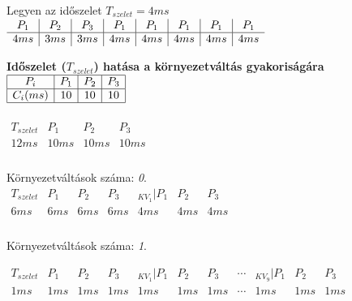 \documentclass[tikz,12pt,margin=0px]{article}
\begin{document}
    \noindent Legyen az időszelet $T_{szelet} = 4 ms$\\

    \noindent $
      \begin{array}{c|c|c|c|c|c|c|c}
        P_{1} & P_{2} & P_{3} & P_{1} & P_{1} & P_{1} & P_{1} & P_{1} \\ \hline
        4ms & 3ms & 3ms & 4ms & 4ms & 4ms & 4ms & 4ms
      \end{array}\\\\
    $

    \noindent \textbf{Időszelet ($T_{szelet}$) hatása a környezetváltás gyakoriságára} \\

    \noindent $\begin{array}{|c|c|c|c|}
                        \hline
                         P_{i} & P_{1} & P_{2} & P_{3}  \\ \hline
                         C_{i}(ms) & 10 & 10 & 10 \\ \hline
                       \end{array}$\\\\

      \noindent $\begin{array}{c||c|c|c}
        T_{szelet} & P_1 & P_2 & P_3  \\ \hline
        12 ms & 10 ms & 10 ms & 10 ms \\
      \end{array}$\\\\

    \noindent Környezetváltások száma: \emph{0}.\\

      \noindent $\begin{array}{c||c|c|c||c|c|c}
        T_{szelet} & P_1 & P_2 & P_3 & _{KV_1} | P_1 & P_2 & P_3  \\ \hline
        6 ms & 6 ms & 6 ms & 6 ms & 4 ms & 4 ms & 4 ms \\
      \end{array}$\\\\

    \noindent Környezetváltások száma: \emph{1}.\\
\newpage

      \noindent $\begin{array}{c||c|c|c||c|c|c||c||c|c|c}
        T_{szelet} & P_1 & P_2 & P_3 &_{KV_1} | P_1 & P_2 & P_3 & \cdots & _{KV_9} | P_1 & P_2 & P_3  \\ \hline
        1 ms & 1 ms & 1 ms & 1 ms & 1 ms & 1 ms & 1 ms & \cdots & 1 ms & 1 ms & 1 ms \\
      \end{array}$\\\\
\end{document}
